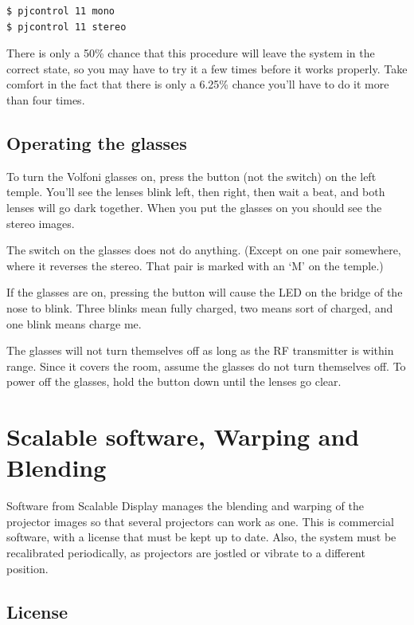 \documentclass[11pt]{article}
\begin{document}
\begin{verbatim}
$ pjcontrol 11 mono
$ pjcontrol 11 stereo
\end{verbatim}

There is only a 50\% chance that this procedure will leave the system
in the correct state, so you may have to try it a few times before it
works properly.  Take comfort in the fact that there is only a 6.25\%
chance you'll have to do it more than four times.

\fi

\subsection{Operating the glasses}

To turn the Volfoni glasses on, press the button (not the switch) on
the left temple.  You'll see the lenses blink left, then right, then
wait a beat, and both lenses will go dark together.  When you put the
glasses on you should see the stereo images.

The switch on the glasses does not do
anything.  (Except on one pair somewhere, where it reverses the
stereo.  That pair is marked with an `M' on the temple.)

If the glasses are on, pressing the button will cause the LED on the
bridge of the nose to blink.  Three blinks mean fully charged, two
means sort of charged, and one blink means charge me.

The glasses will not turn themselves off as long as the RF transmitter
is within range.  Since it covers the room, assume the glasses do not
turn themselves off.  To power off the glasses, hold the button down
until the lenses go clear.


\section{Scalable software, Warping and Blending}

Software from Scalable Display manages the blending and warping of the
projector images so that several projectors can work as one.  This is
commercial software, with a license that must be kept up to date.
Also, the system must be recalibrated periodically, as projectors are
jostled or vibrate to a different position.

\subsection{License}
\end{document}
